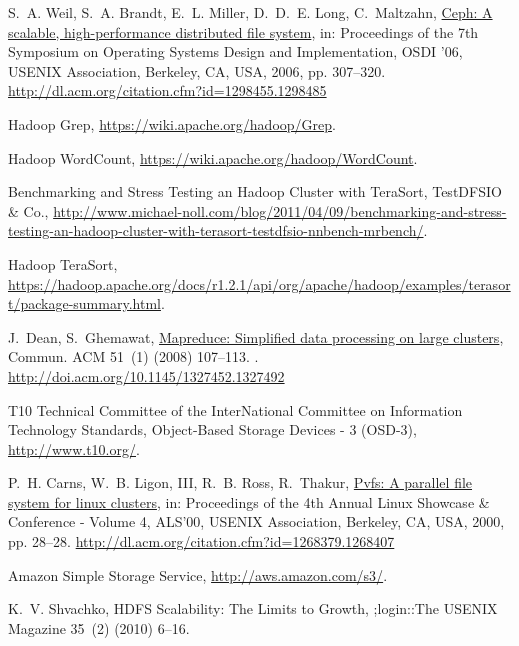 \documentclass[preprint,12pt]{elsarticle}
\begin{document}
\begin{thebibliography}{10}
S.~A. Weil, S.~A. Brandt, E.~L. Miller, D.~D.~E. Long, C.~Maltzahn,
  \href{http://dl.acm.org/citation.cfm?id=1298455.1298485}{Ceph: A scalable,
  high-performance distributed file system}, in: Proceedings of the 7th
  Symposium on Operating Systems Design and Implementation, OSDI '06, USENIX
  Association, Berkeley, CA, USA, 2006, pp. 307--320.
\newline\urlprefix\url{http://dl.acm.org/citation.cfm?id=1298455.1298485}

{Hadoop Grep}, \url{https://wiki.apache.org/hadoop/Grep}.

{Hadoop WordCount}, \url{https://wiki.apache.org/hadoop/WordCount}.

{Benchmarking and Stress Testing an Hadoop Cluster with TeraSort, TestDFSIO \&
  Co.},
  \url{http://www.michael-noll.com/blog/2011/04/09/benchmarking-and-stress-testing-an-hadoop-cluster-with-terasort-testdfsio-nnbench-mrbench/}.

{Hadoop TeraSort},
  \url{https://hadoop.apache.org/docs/r1.2.1/api/org/apache/hadoop/examples/terasort/package-summary.html}.

J.~Dean, S.~Ghemawat,
  \href{http://doi.acm.org/10.1145/1327452.1327492}{Mapreduce: Simplified data
  processing on large clusters}, Commun. ACM 51~(1) (2008) 107--113.
\newblock \href {http://dx.doi.org/10.1145/1327452.1327492}
  {}.
\newline\urlprefix\url{http://doi.acm.org/10.1145/1327452.1327492}

{T10 Technical Committee of the InterNational Committee on Information
  Technology Standards}, Object-{Based} {Storage} {Devices} - 3 {(OSD-3)},
  \url{http://www.t10.org/}.

P.~H. Carns, W.~B. Ligon, III, R.~B. Ross, R.~Thakur,
  \href{http://dl.acm.org/citation.cfm?id=1268379.1268407}{Pvfs: A parallel
  file system for linux clusters}, in: Proceedings of the 4th Annual Linux
  Showcase \& Conference - Volume 4, ALS'00, USENIX Association, Berkeley, CA,
  USA, 2000, pp. 28--28.
\newline\urlprefix\url{http://dl.acm.org/citation.cfm?id=1268379.1268407}

{Amazon Simple Storage Service}, \url{http://aws.amazon.com/s3/}.

K.~V. Shvachko, {HDFS Scalability: The Limits to Growth}, ;login::The USENIX
  Magazine 35~(2) (2010) 6--16.


\end{thebibliography}
\end{document}
